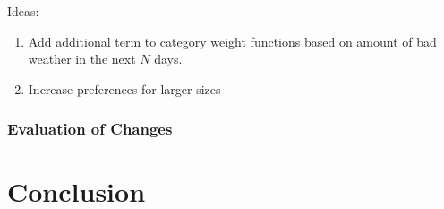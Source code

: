 \documentclass[11pt, letterpaper]{article}
\begin{document}
Ideas:
\begin{enumerate}
\item Add additional term to category weight functions based on amount of bad weather in the next $N$ days.
\item Increase preferences for larger sizes
\end{enumerate}

\subsubsection{Evaluation of Changes}

\section{Conclusion}


%
%
\end{document}
